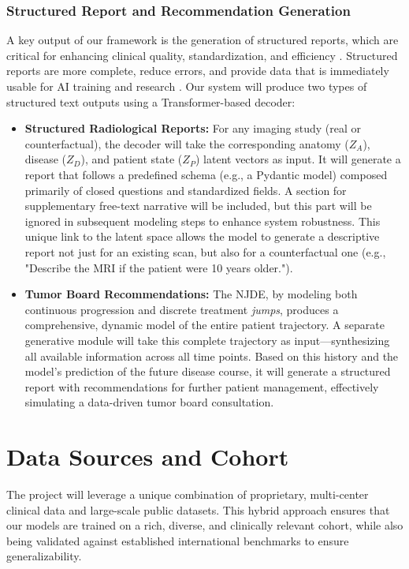 \documentclass[11pt, a4paper]{article}
\begin{document}
\subsubsection{Structured Report and Recommendation Generation}
A key output of our framework is the generation of structured reports, which are critical for enhancing clinical quality, standardization, and efficiency \cite{JorgHalfmann2023}. Structured reports are more complete, reduce errors, and provide data that is immediately usable for AI training and research \cite{SacoranskyKwan2024}. Our system will produce two types of structured text outputs using a Transformer-based decoder:
\begin{itemize}
    \item \textbf{Structured Radiological Reports:} For any imaging study (real or counterfactual), the decoder will take the corresponding anatomy ($Z_A$), disease ($Z_D$), and patient state ($Z_P$) latent vectors as input. It will generate a report that follows a predefined schema (e.g., a Pydantic model) composed primarily of closed questions and standardized fields. A section for supplementary free-text narrative will be included, but this part will be ignored in subsequent modeling steps to enhance system robustness. This unique link to the latent space allows the model to generate a descriptive report not just for an existing scan, but also for a counterfactual one (e.g., "Describe the MRI if the patient were 10 years older.").
    \item \textbf{Tumor Board Recommendations:} The NJDE, by modeling both continuous progression and discrete treatment \textit{jumps}, produces a comprehensive, dynamic model of the entire patient trajectory. A separate generative module will take this complete trajectory as input—synthesizing all available information across all time points. Based on this history and the model's prediction of the future disease course, it will generate a structured report with recommendations for further patient management, effectively simulating a data-driven tumor board consultation.
\end{itemize}

\section{Data Sources and Cohort}
The project will leverage a unique combination of proprietary, multi-center clinical data and large-scale public datasets. This hybrid approach ensures that our models are trained on a rich, diverse, and clinically relevant cohort, while also being validated against established international benchmarks to ensure generalizability.
\end{document}
